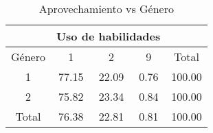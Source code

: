 \documentclass{article}
\begin{document}
\begin{table}[]
\centering
\caption{Aprovechamiento vs Género}
\begin{tabular}{ccccc} \hline \hline
       & \multicolumn{3}{c}{Uso de habilidades}                                                        &        \\ \hline
Género                       & 1                         & 2                         & 9                         & Total                      \\ \hline
1                          & 77.15                     & 22.09                     & 0.76                      & 100.00                     \\
2                          & 75.82                     & 23.34                     & 0.84                      & 100.00                     \\
Total  & 76.38 & 22.81 & 0.81  & 100.00 \\ \hline \hline
\end{tabular}
\end{table}
\end{document}

